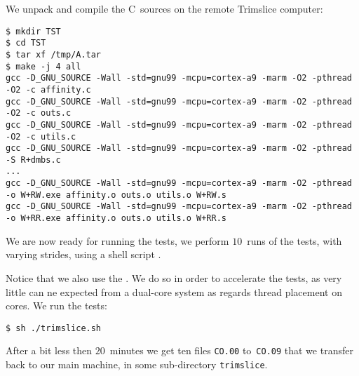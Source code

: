 We unpack and compile the C~sources on the remote Trimslice computer:
\begin{verbatim}
$ mkdir TST
$ cd TST
$ tar xf /tmp/A.tar
$ make -j 4 all
gcc -D_GNU_SOURCE -Wall -std=gnu99 -mcpu=cortex-a9 -marm -O2 -pthread -O2 -c affinity.c
gcc -D_GNU_SOURCE -Wall -std=gnu99 -mcpu=cortex-a9 -marm -O2 -pthread -O2 -c outs.c
gcc -D_GNU_SOURCE -Wall -std=gnu99 -mcpu=cortex-a9 -marm -O2 -pthread -O2 -c utils.c
gcc -D_GNU_SOURCE -Wall -std=gnu99 -mcpu=cortex-a9 -marm -O2 -pthread -S R+dmbs.c
...
gcc -D_GNU_SOURCE -Wall -std=gnu99 -mcpu=cortex-a9 -marm -O2 -pthread  -o W+RW.exe affinity.o outs.o utils.o W+RW.s
gcc -D_GNU_SOURCE -Wall -std=gnu99 -mcpu=cortex-a9 -marm -O2 -pthread  -o W+RR.exe affinity.o outs.o utils.o W+RR.s
\end{verbatim}
We are now ready for running the tests, we perform $10$~runs of the tests,
with varying strides, using a shell script .

Notice that we also use the
.
We do so in order to accelerate the tests, as very little
can ne expected from a dual-core system as regards thread placement on cores.
We run the tests:
\begin{verbatim}
$ sh ./trimslice.sh
\end{verbatim}
After a bit less then $20$~minutes we get ten files
\texttt{CO.00} to~\texttt{CO.09} that we transfer back to our main machine,
in some sub-directory \texttt{trimslice}.

